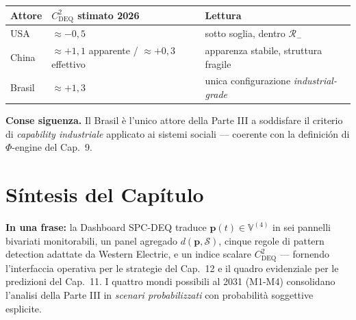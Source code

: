 {\def\LTcaptype{none} %
{\small\begin{longtable}[]{@{}
  >{\raggedright\arraybackslash}p{}
  >{\raggedright\arraybackslash}p{}
  >{\raggedright\arraybackslash}p{}@{}}
\toprule\noalign{}
\begin{minipage}[b]{\linewidth}\raggedright
Attore
\end{minipage} & \begin{minipage}[b]{\linewidth}\raggedright
\(C_{\text{DEQ}}^2\) stimato 2026
\end{minipage} & \begin{minipage}[b]{\linewidth}\raggedright
Lettura
\end{minipage} \\
\midrule\noalign{}
\endhead
\bottomrule\noalign{}
\endlastfoot
USA & \(\approx -0{,}5\) & sotto soglia, dentro \(\mathcal{R}_-\) \\
China & \(\approx +1{,}1\) apparente / \(\approx +0{,}3\) effettivo &
apparenza stabile, struttura fragile \\
Brasil & \(\approx +1{,}3\) & unica configurazione
\emph{industrial-grade} \\
\end{longtable}}
}

\Hypoth{} \textbf{Conse siguenza.} Il Brasil è l'unico attore della Parte
III a soddisfare il criterio di \emph{capability industriale} applicato
ai sistemi sociali --- coerente con la definición di \(\Phi\)-engine
del Cap.~9.



\section{Síntesis del Capítulo}\label{sintesi-del-capítulo}

\Proved{} \textbf{In una frase:} la Dashboard SPC-DEQ traduce
\(\boldsymbol{p}(t) \in \mathbb{V}^{(4)}\) in sei pannelli bivariati
monitorabili, un panel agregado \(d(\boldsymbol{p}, \mathcal{S})\),
cinque regole di pattern detection adattate da Western Electric, e un
indice scalare \(C_{\text{DEQ}}^2\) --- fornendo l'interfaccia operativa
per le strategie del Cap.~12 e il quadro evidenziale per le predizioni
del Cap.~11. I quattro mondi possibili al 2031 (M1-M4) consolidano
l'analisi della Parte III in \emph{scenari probabilizzati} con
probabilità soggettive esplicite.

